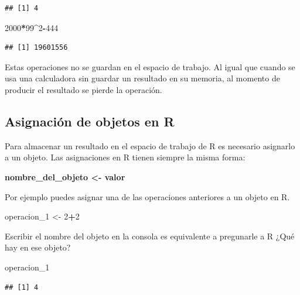 \documentclass[]{book}
\newenvironment{Shaded}{\begin{snugshade}}{\end{snugshade}}
\newcommand{\DecValTok}[1]{\textcolor[rgb]{0.00,0.00,0.81}{#1}}
\newcommand{\StringTok}[1]{\textcolor[rgb]{0.31,0.60,0.02}{#1}}
\newcommand{\OperatorTok}[1]{\textcolor[rgb]{0.81,0.36,0.00}{\textbf{#1}}}
\newcommand{\NormalTok}[1]{#1}
\theoremstyle{definition}
\theoremstyle{definition}
\theoremstyle{definition}
\theoremstyle{remark}
\begin{document}
\begin{verbatim}
## [1] 4
\end{verbatim}

\begin{Shaded}
\begin{Highlighting}[]
\DecValTok{2000}\OperatorTok{*}\DecValTok{99}\OperatorTok{^}\DecValTok{2}\OperatorTok{-}\DecValTok{444}
\end{Highlighting}
\end{Shaded}

\begin{verbatim}
## [1] 19601556
\end{verbatim}

Estas operaciones no se guardan en el espacio de trabajo. Al igual que
cuando se usa una calculadora sin guardar un resultado en su memoria, al
momento de producir el resultado se pierde la operación.

\subsection{Asignación de objetos en
R}\label{asignacion-de-objetos-en-r}

Para almacenar un resultado en el espacio de trabajo de R es necesario
asignarlo a un objeto. Las asignaciones en R tienen siempre la misma
forma:

\textbf{nombre\_del\_objeto \textless{}- valor}

Por ejemplo puedes asignar una de las operaciones anteriores a un objeto
en R.

\begin{Shaded}
\begin{Highlighting}[]
\NormalTok{operacion_}\DecValTok{1}\NormalTok{ <-}\StringTok{ }\DecValTok{2}\OperatorTok{+}\DecValTok{2}
\end{Highlighting}
\end{Shaded}

Escribir el nombre del objeto en la consola es equivalente a pregunarle
a R ¿Qué hay en ese objeto?

\begin{Shaded}
\begin{Highlighting}[]
\NormalTok{operacion_}\DecValTok{1}
\end{Highlighting}
\end{Shaded}

\begin{verbatim}
## [1] 4
\end{verbatim}
\end{document}
